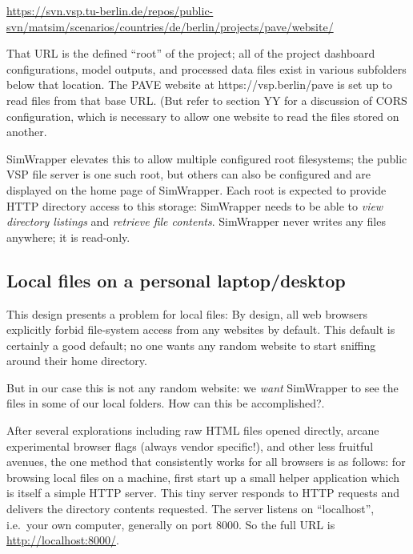 \url{https://svn.vsp.tu-berlin.de/repos/public-svn/matsim/scenarios/countries/de/berlin/projects/pave/website/}

That URL is the defined ``root'' of the project; all of the project
dashboard configurations, model outputs, and processed data files exist
in various subfolders below that location. The PAVE website at
https://vsp.berlin/pave is set up to read files from that base URL. (But
refer to section YY for a discussion of CORS configuration, which is
necessary to allow one website to read the files stored on another.

SimWrapper elevates this to allow multiple configured root filesystems;
the public VSP file server is one such root, but others can also be
configured and are displayed on the home page of SimWrapper. Each root
is expected to provide HTTP directory access to this storage: SimWrapper
needs to be able to \emph{view directory listings} and \emph{retrieve
file contents}. SimWrapper never writes any files anywhere; it is
read-only.


\hypertarget{local-files-on-a-personal-laptopdesktop}{%
\subsection{Local files on a personal
laptop/desktop}\label{local-files-on-a-personal-laptopdesktop}}

This design presents a problem for local files: By design, all web
browsers explicitly forbid file-system access from any websites by
default. This default is certainly a good default; no one wants any
random website to start sniffing around their home directory.

But in our case this is not any random website: we \emph{want}
SimWrapper to see the files in some of our local folders. How can this
be accomplished?.

After several explorations including raw HTML files opened directly,
arcane experimental browser flags (always vendor specific!), and other
less fruitful avenues, the one method that consistently works for all
browsers is as follows: for browsing local files on a machine, first
start up a small helper application which is itself a simple HTTP
server. This tiny server responds to HTTP requests and delivers the
directory contents requested. The server listens on ``localhost'',
i.e.~your own computer, generally on port 8000. So the full URL is
\url{http://localhost:8000/}.


